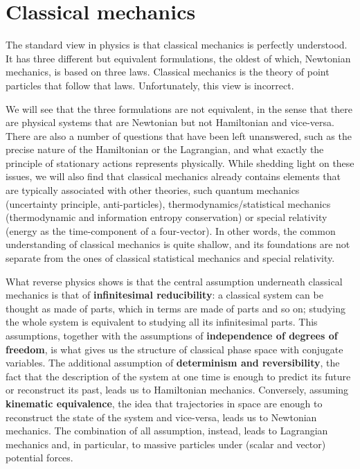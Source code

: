 \chapter{Classical mechanics}

The standard view in physics is that classical mechanics is perfectly understood. It has three different but equivalent formulations, the oldest of which, Newtonian mechanics, is based on three laws. Classical mechanics is the theory of point particles that follow that laws. Unfortunately, this view is incorrect.

We will see that the three formulations are not equivalent, in the sense that there are physical systems that are Newtonian but not Hamiltonian and vice-versa. There are also a number of questions that have been left unanswered, such as the precise nature of the Hamiltonian or the Lagrangian, and what exactly the principle of stationary actions represents physically. While shedding light on these issues, we will also find that classical mechanics already contains elements that are typically associated with other theories, such quantum mechanics (uncertainty principle, anti-particles), thermodynamics/statistical mechanics (thermodynamic and information entropy conservation) or special relativity (energy as the time-component of a four-vector). In other words, the common understanding of classical mechanics is quite shallow, and its foundations are not separate from the ones of classical statistical mechanics and special relativity.

What reverse physics shows is that the central assumption underneath classical mechanics is that of \textbf{infinitesimal reducibility}: a classical system can be thought as made of parts, which in terms are made of parts and so on; studying the whole system is equivalent to studying all its infinitesimal parts. This assumptions, together with the assumptions of \textbf{independence of degrees of freedom}, is what gives us the structure of classical phase space with conjugate variables. The additional assumption of \textbf{determinism and reversibility}, the fact that the description of the system at one time is enough to predict its future or reconstruct its past, leads us to Hamiltonian mechanics. Conversely, assuming \textbf{kinematic equivalence}, the idea that trajectories in space are enough to reconstruct the state of the system and vice-versa, leads us to Newtonian mechanics. The combination of all assumption, instead, leads to Lagrangian mechanics and, in particular, to massive particles under (scalar and vector) potential forces.

